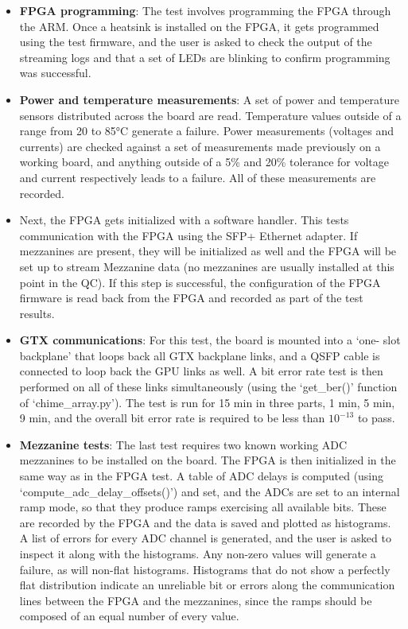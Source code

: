 \documentclass[11pt,article]{memoir}
\begin{document}
\begin{itemize}
	\item \textbf{FPGA programming}: The test involves programming the FPGA through the
	ARM. Once a heatsink is installed on the FPGA, it gets programmed using
	the test firmware, and the user is asked to check the output of the
	streaming logs and that a set of LEDs are blinking to confirm programming
	was successful.


 	\item \textbf{Power and temperature measurements}: A set of power and
 	temperature sensors distributed across the board are read. Temperature
 	values outside of a range from 20 to 85°C generate a failure. Power
 	measurements (voltages and currents) are checked against a set of
 	measurements made previously on a working board, and anything outside of a
 	5\% and 20\% tolerance for voltage and current respectively leads to a
 	failure. All of these measurements are recorded.


	\item Next, the FPGA gets initialized with a software handler. This tests
	communication with the FPGA using the SFP+ Ethernet adapter. If mezzanines
	are present, they will be initialized as well and the FPGA will be set up
	to stream Mezzanine data (no mezzanines are usually installed at this
	point in the QC). If this step is successful, the configuration of the
	FPGA firmware is read back from the FPGA and recorded as part of the test results.

	\item \textbf{GTX communications}: For this test, the board is mounted into a `one-
	slot backplane' that loops back all GTX backplane links, and a QSFP cable
	is connected to loop back the GPU links as well. A bit error rate test is
	then performed on all of these links simultaneously (using the
	`get\_ber()' function of `chime\_array.py'). The test is run for 15 min in
	three parts, 1 min, 5 min, 9 min, and the overall bit error rate is
	required to be less than $10^{-13}$ to pass.

	\item \textbf{Mezzanine tests}: The last test requires two known working ADC mezzanines to
	be installed on the board. The FPGA is then initialized in the same way as
	in the FPGA test. A table of ADC delays is computed (using
	`compute\_adc\_delay\_offsets()') and set, and the ADCs are set to an
	internal ramp mode, so that they produce ramps exercising all available
	bits. These are recorded by the FPGA and the data is saved and plotted as
	histograms. A list of errors for every ADC channel is generated, and the
	user is asked to inspect it along with the histograms. Any non-zero values
	will generate a failure, as will non-flat histograms. Histograms that do
	not show a perfectly flat distribution indicate an unreliable bit or
	errors along the communication lines between the FPGA and the mezzanines,
	since the ramps should be composed of an equal number of every value.

\end{itemize}
\end{document}

